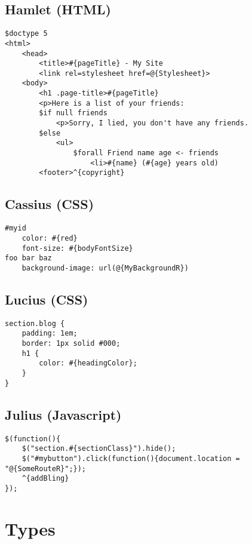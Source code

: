\subsection{Hamlet (HTML)}

\begin{lstlisting}
$doctype 5
<html>
    <head>
        <title>#{pageTitle} - My Site
        <link rel=stylesheet href=@{Stylesheet}>
    <body>
        <h1 .page-title>#{pageTitle}
        <p>Here is a list of your friends:
        $if null friends
            <p>Sorry, I lied, you don't have any friends.
        $else
            <ul>
                $forall Friend name age <- friends
                    <li>#{name} (#{age} years old)
        <footer>^{copyright}
\end{lstlisting}

\subsection{Cassius (CSS)}

\begin{lstlisting}
#myid
    color: #{red}
    font-size: #{bodyFontSize}
foo bar baz
    background-image: url(@{MyBackgroundR})
\end{lstlisting}

\subsection{Lucius (CSS)}

\begin{lstlisting}
section.blog {
    padding: 1em;
    border: 1px solid #000;
    h1 {
        color: #{headingColor};
    }
}
\end{lstlisting}

\subsection{Julius (Javascript)}

\begin{lstlisting}
$(function(){
    $("section.#{sectionClass}").hide();
    $("#mybutton").click(function(){document.location = "@{SomeRouteR}";});
    ^{addBling}
});
\end{lstlisting}

\section{Types}

